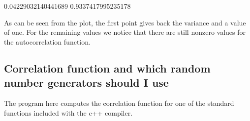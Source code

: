 \documentclass[letterpaper,10pt,english]{sphinxmanual}
\begin{document}
\begin{sphinxVerbatim}[commandchars=\\\{\}]
  
\PYG{p}{[} \PYG{p}{]}
\end{sphinxVerbatim}

\begin{sphinxVerbatim}[commandchars=\\\{\}]
0.04229032140441689 0.9337417995235178
\end{sphinxVerbatim}

\noindent{}

As can be seen from the plot, the first point gives back the variance and a value of one.
For the remaining values we notice that there are still non\sphinxhyphen{}zero values for the auto\sphinxhyphen{}correlation function.


\subsection{Correlation function and which random number generators should I use}
\label{\detokenize{chapter3:correlation-function-and-which-random-number-generators-should-i-use}}
The program here computes the correlation function for one of the standard functions included with the c++ compiler.
\end{document}
